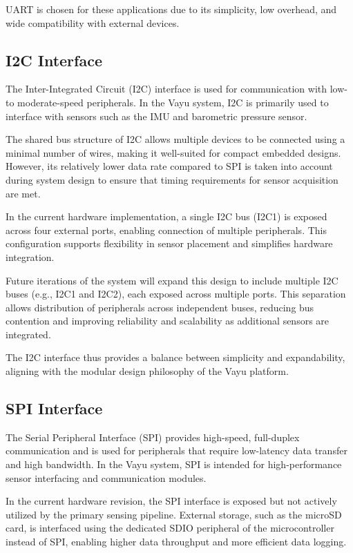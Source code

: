 UART is chosen for these applications due to its simplicity, low overhead, and wide compatibility with external devices.

\subsection{I2C Interface}

The Inter-Integrated Circuit (I2C) interface is used for communication with low- to moderate-speed peripherals. In the Vayu system, I2C is primarily used to interface with sensors such as the IMU and barometric pressure sensor.

The shared bus structure of I2C allows multiple devices to be connected using a minimal number of wires, making it well-suited for compact embedded designs. However, its relatively lower data rate compared to SPI is taken into account during system design to ensure that timing requirements for sensor acquisition are met.

In the current hardware implementation, a single I2C bus (I2C1) is exposed across four external ports, enabling connection of multiple peripherals. This configuration supports flexibility in sensor placement and simplifies hardware integration.

Future iterations of the system will expand this design to include multiple I2C buses (e.g., I2C1 and I2C2), each exposed across multiple ports. This separation allows distribution of peripherals across independent buses, reducing bus contention and improving reliability and scalability as additional sensors are integrated.

The I2C interface thus provides a balance between simplicity and expandability, aligning with the modular design philosophy of the Vayu platform.

\subsection{SPI Interface}

The Serial Peripheral Interface (SPI) provides high-speed, full-duplex communication and is used for peripherals that require low-latency data transfer and high bandwidth. In the Vayu system, SPI is intended for high-performance sensor interfacing and communication modules.

In the current hardware revision, the SPI interface is exposed but not actively utilized by the primary sensing pipeline. External storage, such as the microSD card, is interfaced using the dedicated SDIO peripheral of the microcontroller instead of SPI, enabling higher data throughput and more efficient data logging.

